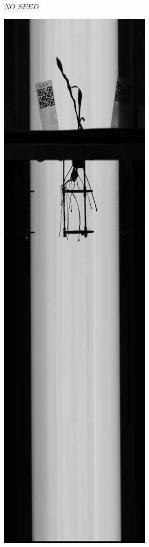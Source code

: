 \begin{figure}
\begin{subfigure}[b]{.13\textwidth}
  \caption{$NO\_SEED$}
  \label{fig:NO_SEED}
\end{subfigure}
%
\begin{subfigure}[b]{.13\textwidth}
  \centering
  \includegraphics[width=\linewidth]{figures/NOT_FG.jpg}

\end{subfigure}
\end{figure}
